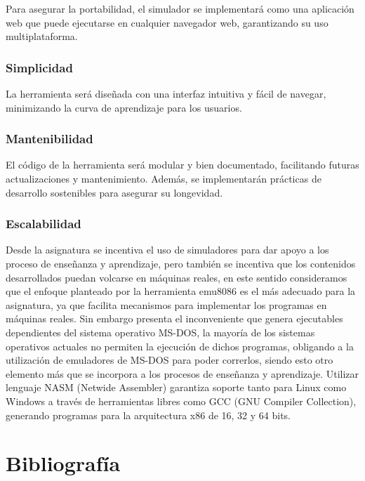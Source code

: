 \documentclass[12pt,twoside]{templates/unerthesis}
\begin{document}
Para asegurar la portabilidad, el simulador se implementará como una aplicación web que puede ejecutarse en cualquier navegador web, garantizando su uso multiplataforma.

\hypertarget{simplicidad}{%
\subsection{Simplicidad}\label{simplicidad}}

La herramienta será diseñada con una interfaz intuitiva y fácil de navegar, minimizando la curva de aprendizaje para los usuarios.

\hypertarget{mantenibilidad}{%
\subsection{Mantenibilidad}\label{mantenibilidad}}

El código de la herramienta será modular y bien documentado, facilitando futuras actualizaciones y mantenimiento. Además, se implementarán prácticas de desarrollo sostenibles para asegurar su longevidad.

\hypertarget{escalabilidad}{%
\subsection{Escalabilidad}\label{escalabilidad}}

Desde la asignatura se incentiva el uso de simuladores para dar apoyo a los proceso de enseñanza y aprendizaje, pero también se incentiva que los contenidos desarrollados puedan volcarse en máquinas reales, en este sentido consideramos que el enfoque planteado por la herramienta emu8086 es el más adecuado para la asignatura, ya que facilita mecanismos para implementar los programas en máquinas reales. Sin embargo presenta el inconveniente que genera ejecutables dependientes del sistema operativo MS-DOS, la mayoría de los sistemas operativos actuales no permiten la ejecución de dichos programas, obligando a la utilización de emuladores de MS-DOS para poder correrlos, siendo esto otro elemento más que se incorpora a los procesos de enseñanza y aprendizaje.
Utilizar lenguaje NASM (Netwide Assembler) garantiza soporte tanto para Linux como Windows a través de herramientas libres como GCC (GNU Compiler Collection), generando programas para la arquitectura x86 de 16, 32 y 64 bits.

\hypertarget{bibliografuxeda}{%
\chapter*{Bibliografía}\label{bibliografuxeda}}
\end{document}
